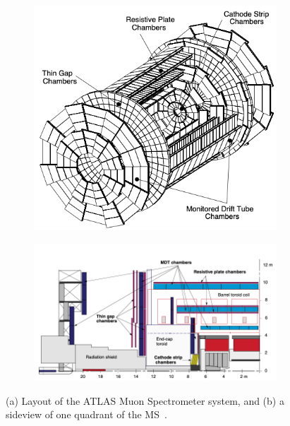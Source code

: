 \begin{figure}[h!]
    \begin{subfigure}[b]{0.4\textwidth}
    \centering
    \includegraphics[width=\textwidth]{figures/MS-overview.png}
    \caption{}
    \label{subfig:MS-system-overview}
    \end{subfigure}
    \hfill
    \begin{subfigure}[b]{0.59\textwidth}
    \centering
    \includegraphics[width=\textwidth]{figures/MS-sideview.png}
    \caption{}
    \label{subfig:MS-system-sideview}
    \end{subfigure}
    \caption{(a) Layout of the ATLAS Muon Spectrometer system, and (b) a sideview of one quadrant of the MS~\cite{ATLAS-TDR-10}.}
    \label{fig:MS-system}
\end{figure}

